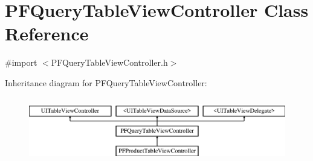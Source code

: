 \hypertarget{interface_p_f_query_table_view_controller}{}\section{P\+F\+Query\+Table\+View\+Controller Class Reference}
\label{interface_p_f_query_table_view_controller}


{\ttfamily \#import $<$P\+F\+Query\+Table\+View\+Controller.\+h$>$}

Inheritance diagram for P\+F\+Query\+Table\+View\+Controller\+:\begin{figure}[H]
\begin{center}
\leavevmode
\includegraphics[height=2.871795cm]{interface_p_f_query_table_view_controller}
\end{center}
\end{figure}
